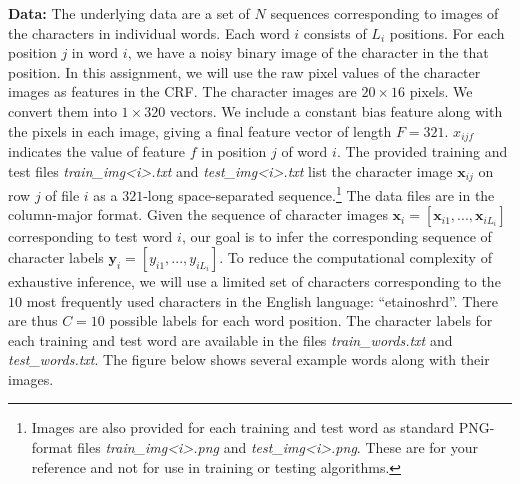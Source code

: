 \documentclass[11pt]{article}
\newcommand{\mbf}[1]{{\mathbf{#1}}}
\begin{document}
\textbf{Data: } The underlying data are a set of $N$ sequences corresponding to images of the characters in individual words. Each word $i$ consists of $L_i$ positions. For each position $j$ in word $i$, we have a noisy binary image of the character in the that position. In this assignment, we will use the raw pixel values of the character images as features in the CRF. The character images are $20\times 16$ pixels. We convert them into $1\times 320$ vectors. We include a constant bias feature along with the pixels in each image, giving a final feature vector of
length $F=321$. $x_{ijf}$ indicates the value of feature $f$ in position $j$ of word $i$. The provided training and test files \textit{train\_img<i>.txt} and \textit{test\_img<i>.txt} list the character image $\mbf{x}_{ij}$ on row $j$ of file $i$ as a $321$-long space-separated sequence.\footnote{Images are also provided for each training and test word as standard PNG-format files \textit{train\_img<i>.png} and \textit{test\_img<i>.png}. These are for your reference and not for use in training or testing algorithms.}
The data files are in the column-major format.
Given the sequence of character images $\mbf{x}_i=[\mbf{x}_{i1},...,\mbf{x}_{iL_i}]$ corresponding to test word $i$, our goal is to infer the corresponding sequence of character labels $\mbf{y}_i=[y_{i1},...,y_{iL_i}]$. To reduce the computational complexity of exhaustive inference, we will use a limited set of characters corresponding to the $10$ most frequently used characters in the English language: ``etainoshrd''. There are thus $C=10$ possible labels for each word position.
The character labels for each training and test word are available in the files
\textit{train\_words.txt} and \textit{test\_words.txt}. The figure below shows several example words along
with their images.  
\end{document}
